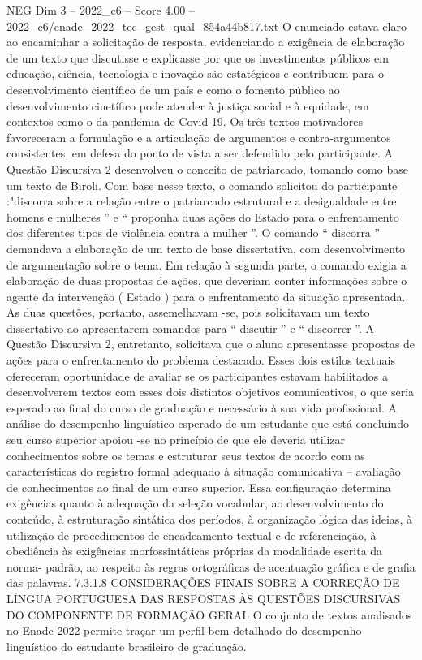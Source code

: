 \begin{textsample}{NEG Dim 3 – 2022\_c6 – Score 4.00 – 2022\_c6/enade\_2022\_tec\_gest\_qual\_854a44b817.txt}
O enunciado estava claro ao encaminhar a solicitação de resposta, evidenciando a exigência de elaboração de um texto que discutisse e explicasse por que os investimentos públicos em educação, ciência, tecnologia e inovação são estatégicos e contribuem para o desenvolvimento científico de um país e como o fomento público ao desenvolvimento cinetífico pode atender à justiça social e à equidade, em contextos como o da pandemia de Covid-19.
Os três textos motivadores favoreceram a formulação e a articulação de argumentos e contra-argumentos consistentes, em defesa do ponto de vista a ser defendido pelo participante.
A Questão Discursiva 2 desenvolveu o conceito de patriarcado, tomando como base um texto de Biroli.
Com base nesse texto, o comando solicitou do participante :"discorra sobre a relação entre o patriarcado estrutural e a desigualdade entre homens e mulheres ” e “ proponha duas ações do Estado para o enfrentamento dos diferentes tipos de violência contra a mulher ”.
O comando “ discorra ” demandava a elaboração de um texto de base dissertativa, com desenvolvimento de argumentação sobre o tema.
Em relação à segunda parte, o comando exigia a elaboração de duas propostas de ações, que deveriam conter informações sobre o agente da intervenção ( Estado ) para o enfrentamento da situação apresentada.
As duas questões, portanto, assemelhavam -se, pois solicitavam um texto dissertativo ao apresentarem comandos para “ discutir ” e “ discorrer ”.
A Questão Discursiva 2, entretanto, solicitava que o aluno apresentasse propostas de ações para o enfrentamento do problema destacado.
Esses dois estilos textuais ofereceram oportunidade de avaliar se os participantes estavam habilitados a desenvolverem textos com esses dois distintos objetivos comunicativos, o que seria esperado ao final do curso de graduação e necessário à sua vida profissional.
A análise do desempenho linguístico esperado de um estudante que está concluindo seu curso superior apoiou -se no princípio de que ele deveria utilizar conhecimentos sobre os temas e estruturar seus textos de acordo com as características do registro formal adequado à situação comunicativa – avaliação de conhecimentos ao final de um curso superior.
Essa configuração determina exigências quanto à adequação da seleção vocabular, ao desenvolvimento do conteúdo, à estruturação sintática dos períodos, à organização lógica das ideias, à utilização de procedimentos de encadeamento textual e de referenciação, à obediência às exigências morfossintáticas próprias da modalidade escrita da norma- padrão, ao respeito às regras ortográficas de acentuação gráfica e de grafia das palavras. 7.3.1.8 CONSIDERAÇÕES FINAIS SOBRE A CORREÇÃO DE LÍNGUA PORTUGUESA DAS RESPOSTAS ÀS QUESTÕES DISCURSIVAS DO COMPONENTE DE FORMAÇÃO GERAL O conjunto de textos analisados no Enade 2022 permite traçar um perfil bem detalhado do desempenho linguístico do estudante brasileiro de graduação.

\end{textsample}

